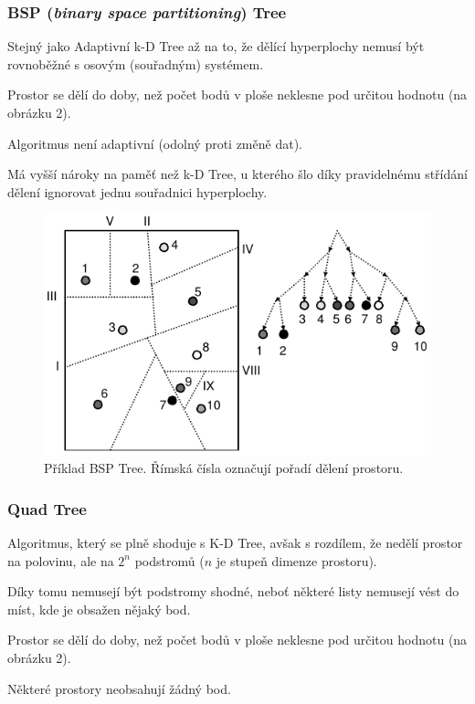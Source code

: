 \subsubsection{BSP (\textit{binary space partitioning}) Tree}

\begin{compactitem}
    \item Stejný jako Adaptivní k-D Tree až na to, že dělící hyperplochy nemusí být rovnoběžné s osovým (souřadným) systémem.
    \item Prostor se dělí do doby, než počet bodů v ploše neklesne pod určitou hodnotu (na obrázku 2).
    \item Algoritmus není adaptivní (odolný proti změně dat).
    \item Má vyšší nároky na paměť než k-D Tree, u kterého šlo díky pravidelnému střídání dělení ignorovat jednu souřadnici hyperplochy.
\end{compactitem}

\begin{figure}[H]
    \centering
    \includegraphics[width=0.75\linewidth]{bsp_tree.pdf}
    \caption{Příklad BSP Tree. Římská čísla označují pořadí dělení prostoru.}
\end{figure}

\subsubsection{Quad Tree}

\begin{compactitem}
    \item Algoritmus, který se plně shoduje s K-D Tree, avšak s rozdílem, že nedělí prostor na polovinu, ale na $2^n$ podstromů ($n$ je stupeň dimenze prostoru). \begin{compactitem}
        \item Díky tomu nemusejí být podstromy shodné, neboť některé listy nemusejí vést do míst, kde je obsažen nějaký bod.
    \end{compactitem}
    \item Prostor se dělí do doby, než počet bodů v ploše neklesne pod určitou hodnotu (na obrázku 2).
    \item Některé prostory neobsahují žádný bod.
\end{compactitem}

